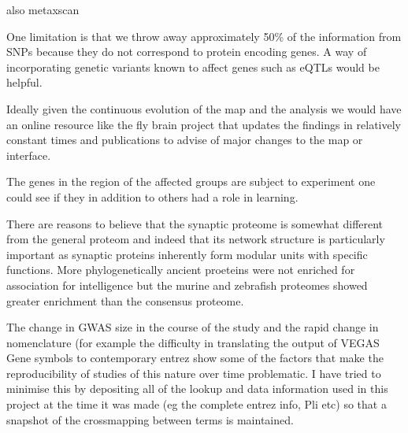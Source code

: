 also metaxscan

One limitation is that we throw away approximately 50\% of the information from SNPs because they do not correspond to protein encoding genes. A way of incorporating genetic variants known to affect genes such as eQTLs would be helpful. 

Ideally given the continuous evolution of the map and the analysis we would have an online resource like the fly brain project that updates the findings in relatively constant times and publications to advise of major changes to the map or interface. 

The genes in the region of the affected groups are subject to experiment one could see if they in addition to others had a role in learning.

There are reasons to believe that the synaptic proteome is somewhat different from the general proteom and indeed that its network structure is particularly important as synaptic proteins inherently form modular units with specific functions. More phylogenetically ancient proeteins were not enriched for association for intelligence but the murine and zebrafish proteomes showed greater enrichment than the consensus proteome.

The change in GWAS size in the course of the study and the rapid change in nomenclature (for example the difficulty in translating the output of VEGAS Gene symbols to contemporary entrez show some of the factors that make the reproducibility of studies of this nature over time problematic. I have tried to minimise this by depositing all of the lookup and data information used in this project at the time it was made (eg the complete entrez info, Pli etc) so that a snapshot of the crossmapping between terms is maintained.


